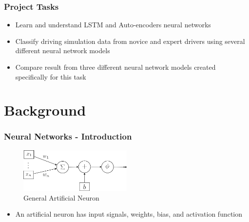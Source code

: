 \documentclass{beamer}
\begin{document}
\begin{frame}
\frametitle{Project Tasks}
\begin{itemize}
\item Learn and understand LSTM and Auto-encoders neural networks
\item Classify driving simulation data from novice and expert drivers using several different neural network models
\item Compare result from three different neural network models created specifically for this task
\end{itemize}
\end{frame}


\section{Background}
\begin{frame}
\frametitle{Neural Networks - Introduction}
\begin{figure}[t!]
    \centering
    \includegraphics[width=0.5\textwidth]{../paper/pictures/figures/general_AN.png}
    \caption{General Artificial Neuron}
    \label{fig:general_AN}
\end{figure}

\begin{itemize}
\item An artificial neuron has input signals, weights, bias, and activation function \cite{raschka2015python}
\end{itemize}
\end{frame}
\end{document}
